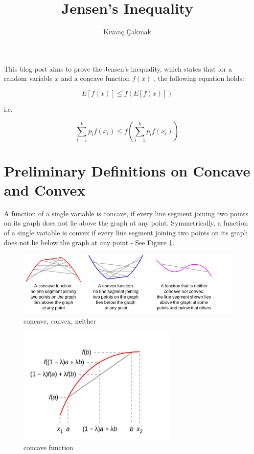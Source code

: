 \documentclass[11pt]{article}
\title{\textbf{Jensen's Inequality}}
\author{K{\i}van\c{c} \c{C}akmak\\}
\date{}
\begin{document}
\maketitle

This blog post aims to prove the Jensen's inequality, which states that for a random variable $x$ and a concave function $f(x)$ , the following equation holds: 

\begin{equation}
E[f(x)] \leq f(E[f(x)]) 
\end{equation}

i.e.

\begin{equation}
\sum_{i=1}^k p_{i} f(x_{i}) \leq f(\sum_{i=1}^k p_{i} f(x_{i})) 
\end{equation}

\section{Preliminary Definitions on Concave and Convex}

A function of a single variable is concave, if every line segment joining two points on its graph does not lie above the graph at any point. Symmetrically, a function of a single variable is convex if every line segment joining two points on its graph does not lie below the graph at any point - See Figure \ref{fig:concave_convex_neither}. \\

\begin{figure} \label{fig:concave_convex_neither}
\centering
\includegraphics[width=\textwidth]{img/concave_convex_neither.png}
\caption{concave, convex, neither}
\end{figure}

\begin{figure} \label{fig:concave}
\centering
\includegraphics[width=0.7\textwidth]{img/concave.png}
\caption{concave function}
\end{figure}
\end{document}
